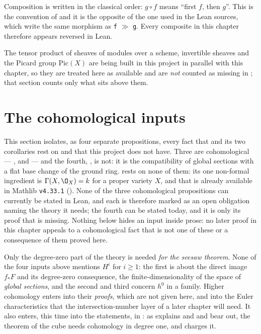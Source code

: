 \begin{warning}\label{warn:cube-composition-order}
Composition is written in the classical order: $g\circ f$ means ``first $f$,
then $g$''.  This is the convention of  and it is the
opposite of the one used in the Lean sources, which write the same morphism as
\texttt{f} $\gg$ \texttt{g}.  Every composite in this chapter therefore
appears reversed in Lean.
\end{warning}

\begin{warning}
\label{warn:cube-parallel-layer}
The tensor product of sheaves of modules over a scheme, invertible sheaves and
the Picard group $\mathrm{Pic}(X)$ are being built in this project in parallel
with this chapter, so they are treated here as available and are \emph{not}
counted as missing in ; that section counts only what sits
above them.
\end{warning}

\section{The cohomological inputs}\label{sec:cube-inputs}

This section isolates, as four separate propositions, every fact that
 and its two corollaries rest on and that this project
does not have.  Three are cohomological ---
,
 and  --- and the
fourth, , is not: it is the
compatibility of global sections with a flat base change of the ground ring.
 rests on none of them: its one non-formal ingredient
is $\Gamma(X,\O_X)=k$ for a proper variety $X$, and that is already available
in Mathlib \texttt{v4.33.1} ().  None of the
three cohomological propositions can currently be stated in Lean, and each is
therefore marked as an open obligation naming the theory it needs; the fourth
can be stated today, and it is only its proof that is missing.  Nothing below
hides an input inside prose: no later proof in this chapter appeals to a
cohomological fact that is not one of these or a consequence of them proved
here.

Only the degree-zero part of the theory is needed \emph{for the seesaw
theorem}.  None of the four inputs above mentions $H^i$ for $i\geq1$: the
first is about the direct image $f_*F$ and its degree-zero consequence, the
finite-dimensionality of the space of \emph{global sections}, and the second
and third concern $h^0$ in a family.  Higher cohomology enters into their
\emph{proofs}, which are not given here, and into the Euler
characteristics that the intersection-number layer of a later chapter will
need.  It also enters, this time into the statements, in
: as  explains and
 and  bear out,
the theorem of the cube needs cohomology in degree one, and
 charges it.

